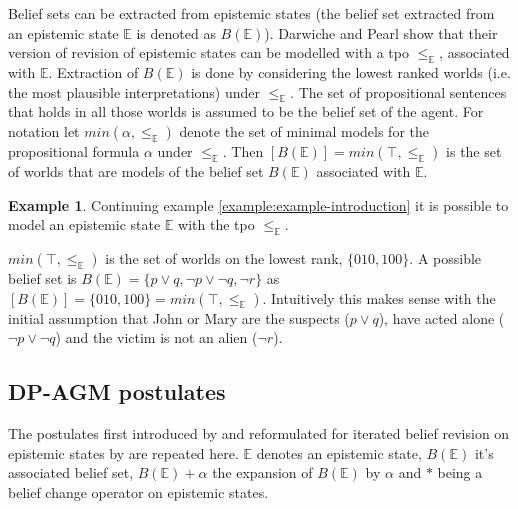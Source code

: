 \documentclass[english, 12pt]{scrartcl}
\theoremstyle{definition}
\newtheorem{example}{Example}[section]
\theoremstyle{definition}
\theoremstyle{definition}
\begin{document}
Belief sets can be extracted from epistemic states (the belief set extracted from an epistemic state $\mathbb{E}$ is denoted as $B(\mathbb{E})$). Darwiche and Pearl show that their version of revision of epistemic states can be modelled with a tpo $\leq_{\mathbb{E}}$, associated with $\mathbb{E}$. Extraction of $B(\mathbb{E})$ is done by considering the lowest ranked worlds (i.e. the most plausible interpretations) under $\leq_{\mathbb{E}}$. The set of propositional sentences that holds in all those worlds is assumed to be the belief set of the agent. For notation let $min(\alpha, \leq_{\mathbb{E}})$ denote the set of minimal models for the propositional formula $\alpha$ under $\leq_{\mathbb{E}}$. Then $[B(\mathbb{E})] = min(\top, \leq_{\mathbb{E}})$ is the set of worlds that are models of the belief set $B(\mathbb{E})$ associated with $\mathbb{E}$.

\begin{example}
    Continuing example \ref{example:example-introduction} it is possible to model an epistemic state $\mathbb{E}$ with the tpo $\leq_{\mathbb{E}}$.
    
    $min(\top, \leq_{\mathbb{E}})$ is the set of worlds on the lowest rank, $\{010, 100\}$. A possible belief set is $B(\mathbb{E}) = \{p \vee q, \neg p \vee \neg q, \neg r\}$ as $[B(\mathbb{E})] = \{010, 100\} = min(\top, \leq_{\mathbb{E}})$. Intuitively this makes sense with the initial assumption that John or Mary are the suspects ($p \vee q$), have acted alone ($\neg p \vee \neg q$) and the victim is not an alien ($\neg r$).
\end{example}


\subsection{DP-AGM postulates}
\label{chapter:dp-agm-postulates}
The postulates first introduced by \cite{Alchourron1985} and reformulated for iterated belief revision on epistemic states by \cite{Darwiche1997} are repeated here. $\mathbb{E}$ denotes an epistemic state, $B(\mathbb{E})$ it's associated belief set, $B(\mathbb{E}) + \alpha$ the expansion of $B(\mathbb{E})$ by $\alpha$ and $\ast$ being a belief change operator on epistemic states. 
\end{document}

